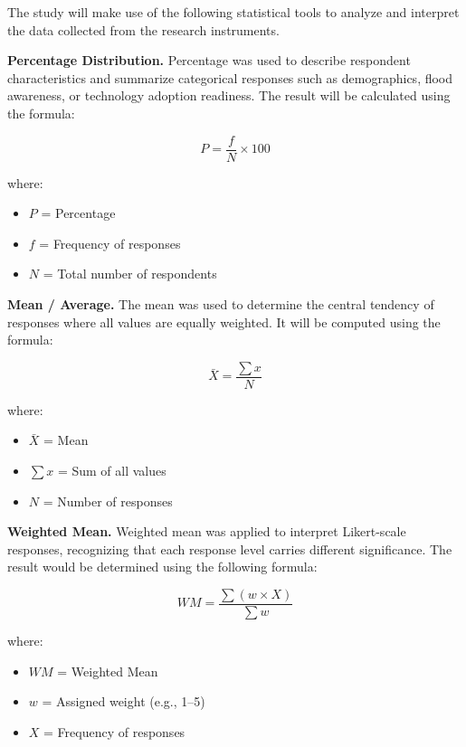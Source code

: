 \documentclass{research}
\begin{document}
The study will make use of the following statistical tools to analyze and interpret the data collected from the research instruments.

\textbf{Percentage Distribution.} Percentage was used to describe respondent characteristics and summarize categorical responses such as demographics, flood awareness, or technology adoption readiness. The result will be calculated using the formula:

\begin{equation}
    P = \frac{f}{N} \times 100
\end{equation}

\noindent where:
\begin{itemize}
    \item $P$ = Percentage
    \item $f$ = Frequency of responses
    \item $N$ = Total number of respondents
\end{itemize}

\textbf{Mean / Average.} The mean was used to determine the central tendency of responses where all values are equally weighted. It will be computed using the formula:

\begin{equation}
    \bar{X} = \frac{\sum x}{N}
\end{equation}

\noindent where:
\begin{itemize}
    \item $\bar{X}$ = Mean
    \item $\sum x$ = Sum of all values
    \item $N$ = Number of responses
\end{itemize}

\textbf{Weighted Mean.} Weighted mean was applied to interpret Likert-scale responses, recognizing that each response level carries different significance. The result would be determined using the following formula:

\begin{equation}
    WM = \frac{\sum (w \times X)}{\sum w}
\end{equation}

\noindent where:
\begin{itemize}
    \item $WM$ = Weighted Mean
    \item $w$ = Assigned weight (e.g., 1--5)
    \item $X$ = Frequency of responses
\end{itemize}
\end{document}
